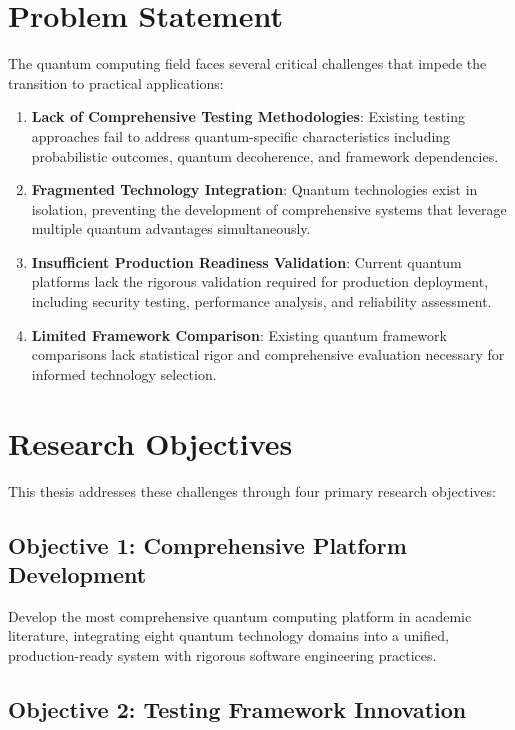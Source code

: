 \documentclass[12pt,a4paper]{report}
\begin{document}
\section{Problem Statement}

The quantum computing field faces several critical challenges that impede the transition to practical applications:

\begin{enumerate}
\item \textbf{Lack of Comprehensive Testing Methodologies}: Existing testing approaches fail to address quantum-specific characteristics including probabilistic outcomes, quantum decoherence, and framework dependencies.

\item \textbf{Fragmented Technology Integration}: Quantum technologies exist in isolation, preventing the development of comprehensive systems that leverage multiple quantum advantages simultaneously.

\item \textbf{Insufficient Production Readiness Validation}: Current quantum platforms lack the rigorous validation required for production deployment, including security testing, performance analysis, and reliability assessment.

\item \textbf{Limited Framework Comparison}: Existing quantum framework comparisons lack statistical rigor and comprehensive evaluation necessary for informed technology selection.
\end{enumerate}

\section{Research Objectives}

This thesis addresses these challenges through four primary research objectives:

\subsection{Objective 1: Comprehensive Platform Development}

Develop the most comprehensive quantum computing platform in academic literature, integrating eight quantum technology domains into a unified, production-ready system with rigorous software engineering practices.

\subsection{Objective 2: Testing Framework Innovation}
\end{document}
